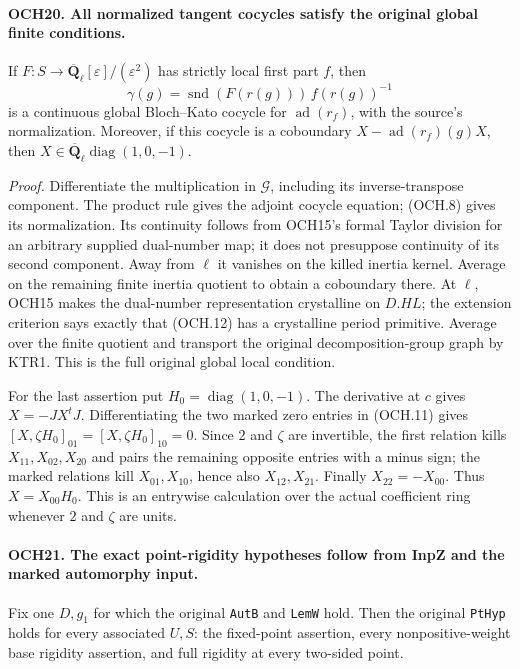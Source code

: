 \documentclass[11pt,a4paper]{article}
\numberwithin{equation}{section}
\theoremstyle{remark}\newtheorem{remark}[theorem]{Remark}
\begin{document}
\paragraph{OCH20. All normalized tangent cocycles satisfy the original global finite conditions.}
\label{claim:OCH20}
If \(F:S\to\overline{\mathbf Q}_\ell[\varepsilon]/(\varepsilon^2)\)
has strictly local first part \(f\), then
\[
       \gamma(g)=\operatorname{snd}(F(r(g)))\,
                         f(r(g))^{-1}
 \tag{OCH.12}
\]
is a continuous global Bloch--Kato cocycle for
\(\operatorname{ad}(r_f)\), with the source's normalization.
Moreover, if this cocycle is a coboundary
\(X-\operatorname{ad}(r_f)(g)X\), then
\(X\in\overline{\mathbf Q}_\ell\operatorname{diag}(1,0,-1)\).

\emph{Proof.}
Differentiate the multiplication in \(\mathcal G\), including
its inverse-transpose component.  The product rule gives the
adjoint cocycle equation; (OCH.8) gives its normalization.  Its
continuity follows from OCH15's formal Taylor division for an
arbitrary supplied dual-number map; it does not presuppose continuity
of its second component.  Away from \(\ell\) it vanishes
on the killed inertia kernel.  Average on the remaining finite
inertia quotient to obtain a coboundary there.  At \(\ell\),
OCH15 makes the dual-number representation crystalline on
\(D.HL\); the extension criterion says exactly that (OCH.12)
has a crystalline period primitive.  Average over the finite
quotient and transport the original decomposition-group graph by
KTR1.  This is the full original global local condition.

For the last assertion put \(H_0=\operatorname{diag}(1,0,-1)\).
The derivative at \(c\) gives \(X=-JX^tJ\).
Differentiating the two marked zero entries in (OCH.11) gives
\([X,\zeta H_0]_{01}=[X,\zeta H_0]_{10}=0\).
Since \(2\) and \(\zeta\) are invertible, the first relation
kills \(X_{11},X_{02},X_{20}\) and pairs the remaining opposite
entries with a minus sign; the marked relations kill
\(X_{01},X_{10}\), hence also \(X_{12},X_{21}\).
Finally \(X_{22}=-X_{00}\).  Thus \(X=X_{00}H_0\).
This is an entrywise calculation over the actual coefficient ring
whenever \(2\) and \(\zeta\) are units.

\paragraph{OCH21. The exact point-rigidity hypotheses follow from InpZ and the marked automorphy input.}
\label{claim:OCH21}
Fix one \(D,g_1\) for which the original \texttt{Aut\allowbreak B} and
\texttt{Lem\allowbreak W} hold.  Then the original \texttt{Pt\allowbreak Hyp} holds for
every associated \(U,S\): the fixed-point assertion, every
nonpositive-weight base rigidity assertion, and full rigidity at
every two-sided point.
\end{document}
